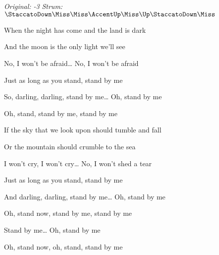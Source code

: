 \begin{song}


\begin{headerbox}
\RaiseBoxWithAccents
\textit{Original: -3} \quad
\textit{Strum:} $\StaccatoDown\Miss\Miss\AccentUp\Miss\Up\StaccatoDown\Miss$
\end{headerbox}

\begin{hchordbox}
\end{hchordbox}

\Large

\bigskip

\Intro {}     \par

\bigskip

When the night has come  and the land is dark \par
And the moon is the only light we'll see \par
No, I won't be afraid… No, I won't be afraid \par
Just as long as you stand, stand by me \par

\bigskip

So, darling, darling, stand by me… Oh, stand by me \par
Oh, stand,  stand by me,  stand by me \par


\bigskip

If the sky that we look upon  should tumble and fall \par
Or the mountain should crumble to the sea \par
I won't cry, I won't cry… No, I won't shed a tear \par
Just as long as you stand, stand by me \par

\bigskip

And darling, darling, stand by me… Oh, stand by me \par
Oh, stand now,  stand by me,  stand by me \par

\bigskip

 \par
{}Stand by me… Oh, stand by me \par
Oh, stand now, oh, stand, stand by me \par

\end{song}